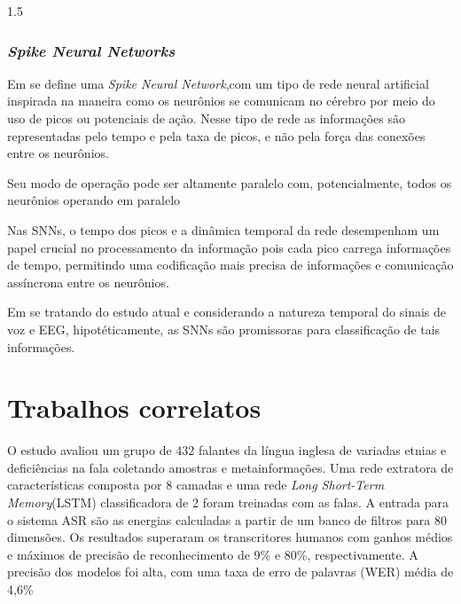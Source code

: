 \documentclass[a4paper,12pt,openright,oneside]{book}
\newenvironment{myenv}[1]
  {\begin{spacing}{#1}}
  {\end{spacing}}
\begin{document}
\begin{myenv}{1.5}
					\subsubsection{\textit{Spike Neural Networks}}
						\par Em \cite{kasabov2018time} se define uma \textit{Spike Neural Network},com um tipo de rede neural artificial inspirada na maneira como os neurônios se comunicam no cérebro por meio do uso de picos ou potenciais de ação. Nesse tipo de rede as informações são representadas pelo tempo e pela taxa de picos, e não pela força das conexões entre os neurônios.
						
						\par Seu modo de operação pode ser altamente paralelo com, potencialmente, todos os neurônios operando em paralelo
					
						\par Nas SNNs, o tempo dos picos e a dinâmica temporal da rede desempenham um papel crucial no processamento da informação pois cada pico carrega informações de tempo, permitindo uma codificação mais precisa de informações e comunicação assíncrona entre os neurônios.
					
						\par Em se tratando do estudo atual e considerando a natureza temporal do sinais de voz e EEG, hipotéticamente, as SNNs são promissoras para classificação de tais informações.					
				
			\section{Trabalhos correlatos}
				\label{sec:trabcorrelatos}
		
				\par O estudo \cite{WOS:000841879504172} avaliou um grupo de 432 falantes da língua inglesa de variadas etnias e deficiências na fala coletando amostras e metainformações. Uma rede extratora de características composta por 8 camadas e uma rede \textit{Long Short-Term Memory}(LSTM) classificadora de 2 foram treinadas com as falas. A entrada para o sistema ASR são as energias calculadas a partir de um banco de filtros para 80 dimensões. Os resultados superaram os transcritores humanos com ganhos médios e máximos de precisão de reconhecimento de 9\% e 80\%, respectivamente. A precisão dos modelos foi alta, com uma taxa de erro de palavras (WER) média de 4,6\%\newline
				

\end{myenv}
\end{document}
